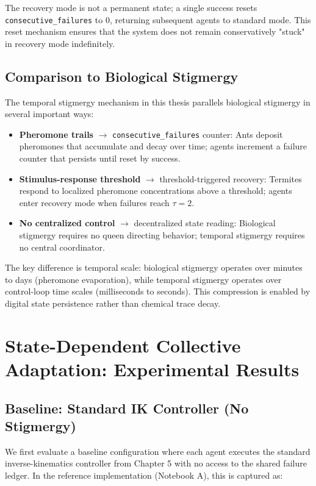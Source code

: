 \documentclass[12pt,a4paper,oneside]{report}
\begin{document}
The recovery mode is not a permanent state; a single success resets \texttt{consecutive\_failures} to 0, returning subsequent agents to standard mode. This reset mechanism ensures that the system does not remain conservatively "stuck" in recovery mode indefinitely.

\subsection{Comparison to Biological Stigmergy}

The temporal stigmergy mechanism in this thesis parallels biological stigmergy in several important ways:

\begin{itemize}
    \item \textbf{Pheromone trails} $\rightarrow$ \texttt{consecutive\_failures} counter: Ants deposit pheromones that accumulate and decay over time; agents increment a failure counter that persists until reset by success.
    \item \textbf{Stimulus-response threshold} $\rightarrow$ threshold-triggered recovery: Termites respond to localized pheromone concentrations above a threshold; agents enter recovery mode when failures reach $\tau = 2$.
    \item \textbf{No centralized control} $\rightarrow$ decentralized state reading: Biological stigmergy requires no queen directing behavior; temporal stigmergy requires no central coordinator.
\end{itemize}

The key difference is temporal scale: biological stigmergy operates over minutes to days (pheromone evaporation), while temporal stigmergy operates over control-loop time scales (milliseconds to seconds). This compression is enabled by digital state persistence rather than chemical trace decay.

\section{State-Dependent Collective Adaptation: Experimental Results}

\subsection{Baseline: Standard IK Controller (No Stigmergy)}

We first evaluate a baseline configuration where each agent executes the standard inverse-kinematics controller from Chapter 5 with no access to the shared failure ledger. In the reference implementation (Notebook A), this is captured as:
\end{document}
